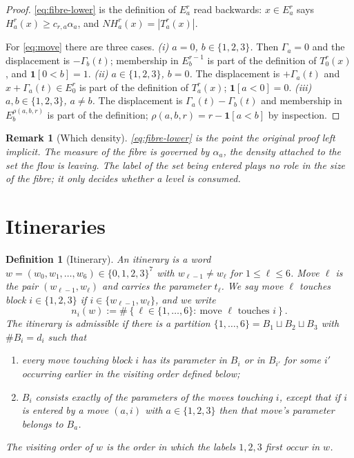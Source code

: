 \documentclass[11pt]{article}
\newtheorem{definition}[theorem]{Definition}
\newtheorem{remark}[theorem]{Remark}
\newcommand{\one}{\mathbf{1}}
\newcommand{\abs}[1]{\left|#1\right|}
\newcommand{\set}[1]{\left\{#1\right\}}
\newcommand{\indices}{\{1,2,3\}}
\newcommand{\Idx}{\{0,1,2,3\}}
\begin{document}
\begin{proof}
  \eqref{eq:fibre-lower} is the definition of $E_a^r$ read backwards:
  $x\in E_a^r$ says $H_a^r(x)\geq c_{r,a}\alpha_a$, and $N H^r_a(x)=\abs{T^r_a(x)}$.

  For \eqref{eq:move} there are three cases.
  \emph{(i) $a=0$, $b\in\indices$.}  Then $\Gamma_a=0$ and the displacement is
  $-\Gamma_b(t)$; membership in $E_b^{r-1}$ is part of the definition of
  $T_0^r(x)$, and $\one[0<b]=1$.
  \emph{(ii) $a\in\indices$, $b=0$.}  The displacement is $+\Gamma_a(t)$ and
  $x+\Gamma_a(t)\in E_0^r$ is part of the definition of $T^r_a(x)$; $\one[a<0]=0$.
  \emph{(iii) $a,b\in\indices$, $a\neq b$.}  The displacement is
  $\Gamma_a(t)-\Gamma_b(t)$ and membership in $E_b^{\rho(a,b,r)}$ is part of the
  definition; $\rho(a,b,r)=r-\one[a<b]$ by inspection.
\end{proof}

\begin{remark}[Which density]
  \label{rem:which-density}
  \eqref{eq:fibre-lower} is the point the original proof left implicit.  The
  measure of the fibre is governed by $\alpha_a$, the density attached to the set
  the flow is \emph{leaving}.  The label of the set being entered plays no role in
  the size of the fibre; it only decides whether a level is consumed.
\end{remark}

\section{Itineraries}
\label{sec:itineraries}

\begin{definition}[Itinerary]
  \label{def:itinerary}
  An \emph{itinerary} is a word $w=(w_0,w_1,\dots,w_6)\in\Idx^{7}$ with
  $w_{\ell-1}\neq w_\ell$ for $1\leq\ell\leq6$.  Move $\ell$ is the pair
  $(w_{\ell-1},w_\ell)$ and carries the parameter $t_\ell$.  We say move $\ell$
  \emph{touches} block $i\in\indices$ if $i\in\{w_{\ell-1},w_\ell\}$, and we write
  \[
    n_i(w):=\#\set{\ell\in\{1,\dots,6\}:\ \text{move }\ell\text{ touches } i}.
  \]
  The itinerary is \emph{admissible} if there is a partition
  $\{1,\dots,6\}=B_1\sqcup B_2\sqcup B_3$ with $\#B_i=d_i$ such that
  \begin{enumerate}[label=(\roman*)]
    \item every move touching block $i$ has its parameter in $B_i$ or in $B_{i'}$
      for some $i'$ occurring \emph{earlier} in the visiting order defined below;
    \item $B_i$ consists exactly of the parameters of the moves touching $i$,
      except that if $i$ is entered by a move $(a,i)$ with $a\in\indices$ then
      that move's parameter belongs to $B_a$.
  \end{enumerate}
  The \emph{visiting order} of $w$ is the order in which the labels
  $1,2,3$ first occur in $w$.
\end{definition}
\end{document}
